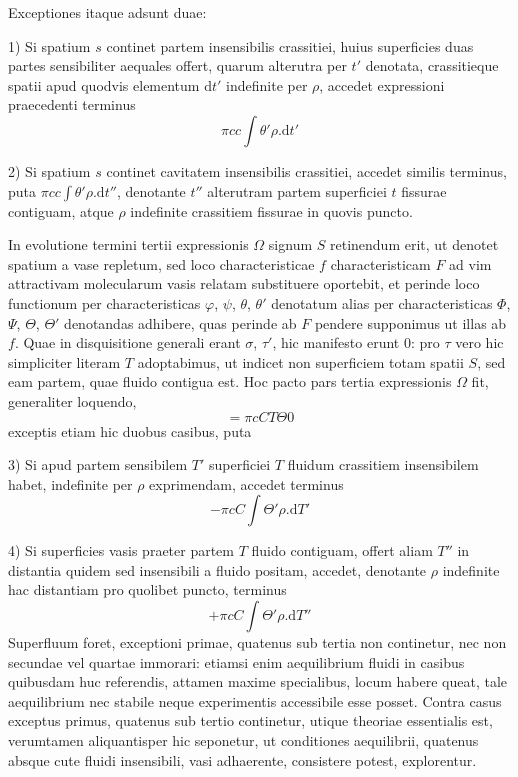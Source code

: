 Exceptiones itaque adsunt duae:

1) Si spatium $s$ continet partem insensibilis crassitiei, huius superficies duas partes sensibiliter aequales offert, quarum alterutra per $t'$ denotata, crassitieque spatii apud quodvis elementum $\mathrm{d}t'$ indefinite per $\rho$, accedet expressioni praecedenti terminus
\[
\pi cc\int\theta'\rho.\mathrm{d}t'
\]

2) Si spatium $s$ continet cavitatem insensibilis crassitiei, accedet similis terminus, puta $\pi cc\int\theta'\rho.\mathrm{d}t''$, denotante $t''$ alterutram partem superficiei $t$ fissurae contiguam, atque $\rho$ indefinite crassitiem fissurae in quovis puncto.

In evolutione termini tertii expressionis $\Omega$ signum $S$ retinendum erit, ut denotet spatium a vase repletum, sed loco characteristicae $f$ characteristicam $F$ ad vim attractivam molecularum vasis relatam substituere oportebit, et perinde loco functionum per characteristicas $\varphi$, $\psi$, $\theta$, $\theta'$ denotatum alias per characteristicas $\Phi$, $\Psi$, $\Theta$, $\Theta'$ denotandas adhibere, quas perinde ab $F$ pendere supponimus ut illas ab $f$. Quae in disquisitione generali erant $\sigma$, $\tau'$, hic manifesto erunt $0$: pro $\tau$ vero hic simpliciter literam $T$ adoptabimus, ut indicet non superficiem totam spatii $S$, sed eam partem, quae fluido contigua est. Hoc pacto pars tertia expressionis $\Omega$ fit, generaliter loquendo,
\[
=\pi cCT\Theta0
\]
exceptis etiam hic duobus casibus, puta

3) Si apud partem sensibilem $T'$ superficiei $T$ fluidum crassitiem insensibilem habet, indefinite per $\rho$ exprimendam, accedet terminus
\[
-\pi cC\int\Theta'\rho.\mathrm{d}T'
\]

4) Si superficies vasis praeter partem $T$ fluido contiguam, offert aliam $T''$ in distantia quidem sed insensibili a fluido positam, accedet, denotante $\rho$ indefinite hac distantiam pro quolibet puncto, terminus
\[
+\pi cC\int\Theta'\rho.\mathrm{d}T''
\]
Superfluum foret, exceptioni primae, quatenus sub tertia non continetur, nec non secundae vel quartae immorari: etiamsi enim aequilibrium fluidi in casibus quibusdam huc referendis, attamen maxime specialibus, locum habere queat, tale aequilibrium nec stabile neque experimentis accessibile esse posset. Contra casus exceptus primus, quatenus sub tertio continetur, utique theoriae essentialis est, verumtamen aliquantisper hic seponetur, ut conditiones aequilibrii, quatenus absque cute fluidi insensibili, vasi adhaerente, consistere potest, explorentur.

